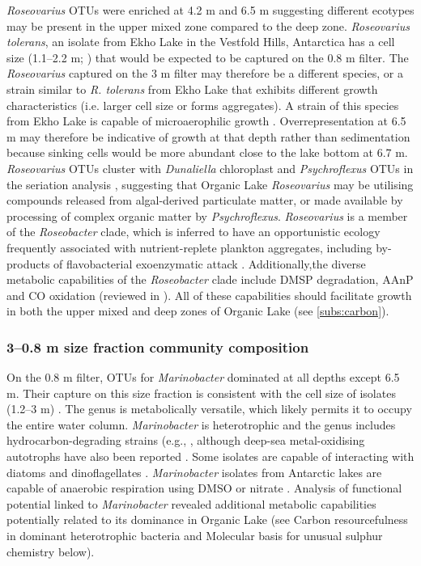 \emph{Roseovarius} \acp{OTU} were enriched at 4.2 m and 6.5 m suggesting different ecotypes may be present in the upper mixed zone compared to the deep zone. 
\emph{Roseovarius tolerans}, an isolate from Ekho Lake in the Vestfold Hills, Antarctica has a cell size (1.1--2.2 \textmu{}m; \cite{Labrenz1999}) that would be expected to be captured on the 0.8 \textmu{}m filter. 
The \emph{Roseovarius} captured on the 3 \textmu{}m filter may therefore be a different species, or a strain similar to \emph{R. tolerans} from Ekho Lake that exhibits different growth characteristics (i.e. larger cell size or forms aggregates). 
A strain of this species from Ekho Lake is capable of microaerophilic growth \cite{Labrenz1999}. 
Overrepresentation at 6.5 m may therefore be indicative of growth at that depth rather than sedimentation because sinking cells would be more abundant close to the lake bottom at 6.7 m. 
\emph{Roseovarius} \acp{OTU} cluster with \emph{Dunaliella} chloroplast and \emph{Psychroflexus} \acp{OTU} in the seriation analysis , suggesting that Organic Lake \emph{Roseovarius} may be utilising compounds released from algal-derived particulate matter, or made available by processing of complex organic matter by \emph{Psychroflexus}.
\emph{Roseovarius} is a member of the \emph{Roseobacter} clade, which is inferred to have an opportunistic ecology frequently associated with nutrient-replete plankton aggregates, including by-products of flavobacterial exoenzymatic attack \cite{Moran2007a, Teeling2012a}. 
Additionally,the diverse metabolic capabilities of the \emph{Roseobacter} clade include \ac{DMSP} degradation, \ac{AAnP} and CO oxidation (reviewed in \citet{Wagner-Dobler2006}). 
All of these capabilities should facilitate growth in both the upper mixed and deep zones of Organic Lake (see \ref{subs:carbon}).

\subsubsection{3--0.8 \textmu{}m size fraction community composition}
On the 0.8 \textmu{}m filter, \acp{OTU} for \emph{Marinobacter} dominated at all depths except 6.5 m. 
Their capture on this size fraction is consistent with the cell size of isolates (1.2--3 \textmu{}m) \cite{Gauthier1992}. 
The genus is metabolically versatile, which likely permits it to occupy the entire water column. 
\emph{Marinobacter} is heterotrophic and the genus includes hydrocarbon-degrading strains (e.g., \citet{Gauthier1992, Huu1999}, although deep-sea metal-oxidising autotrophs have also been reported \cite{Edwards2003}. 
Some isolates are capable of interacting with diatoms \cite{Gardes2010} and dinoflagellates \cite{Green2006}. 
\emph{Marinobacter} isolates from Antarctic lakes are capable of anaerobic respiration using \ac{DMSO} \cite{Matsuzaki2006} or nitrate \cite{Ward1997}. 
Analysis of functional potential linked to \emph{Marinobacter} revealed additional metabolic capabilities potentially related to its dominance in Organic Lake 
(see Carbon resourcefulness in dominant heterotrophic bacteria and Molecular basis for unusual sulphur chemistry below).%

